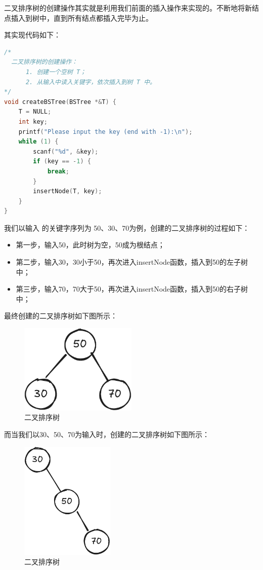 \documentclass[lang=cn,newtx,10pt,scheme=chinese]{../elegantbook}
\begin{document}
二叉排序树的创建操作其实就是利用我们前面的插入操作来实现的。不断地将新结点插入到树中，直到所有结点都插入完毕为止。

其实现代码如下：

\begin{lstlisting}[language=C++, caption={二叉排序树的创建操作}]
  /*
  二叉排序树的创建操作：
      1. 创建一个空树 T；
      2. 从输入中读入关键字，依次插入到树 T 中。
*/
void createBSTree(BSTree *&T) {
    T = NULL;
    int key;
    printf("Please input the key (end with -1):\n");
    while (1) {
        scanf("%d", &key);
        if (key == -1) {
            break;
        }
        insertNode(T, key);
    }
}
\end{lstlisting}

我们以输入 的关键字序列为 50、30、70为例，创建的二叉排序树的过程如下：

\begin{itemize}
  \item 第一步，输入50，此时树为空，50成为根结点；
  \item 第二步，输入30，30小于50，再次进入insertNode函数，插入到50的左子树中；
  \item 第三步，输入70，70大于50，再次进入insertNode函数，插入到50的右子树中；
  \end{itemize}
最终创建的二叉排序树如下图所示：

\begin{figure}[h!]
  \centering
  \includegraphics[width=0.5\textwidth]{./figure/pdf/cropped/bsTree.pdf}
  \caption{二叉排序树}
  \label{fig:bstree}
\end{figure}

而当我们以30、50、70为输入时，创建的二叉排序树如下图所示：

\begin{figure}[h!]
  \centering
  \includegraphics[width=0.4\textwidth]{./figure/pdf/cropped/bsTree2.pdf}
  \caption{二叉排序树}
  \label{fig:bstree2}
\end{figure}
\end{document}
